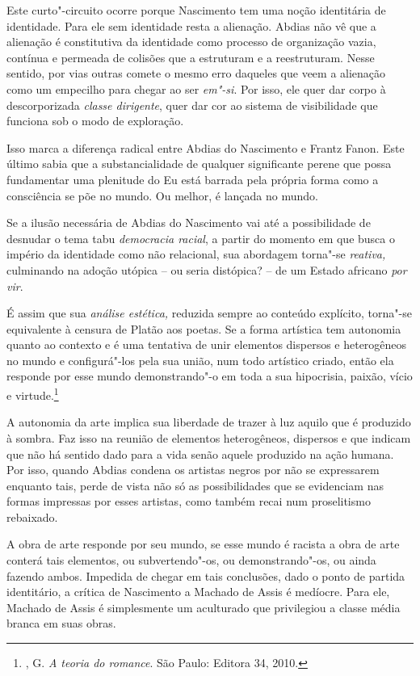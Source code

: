 Este curto"-circuito ocorre porque Nascimento tem uma noção identitária
de identidade. Para ele sem identidade resta a alienação. Abdias não vê
que a alienação é constitutiva da identidade como processo de
organização vazia, contínua e permeada de colisões que a estruturam e a
reestruturam. Nesse sentido, por vias outras comete o mesmo erro
daqueles que veem a alienação como um empecilho para chegar ao ser
\emph{em"-si}. Por isso, ele quer dar corpo à descorporizada \emph{classe
dirigente}, quer dar cor ao sistema de visibilidade que funciona sob o
modo de exploração.

Isso marca a diferença radical entre Abdias do Nascimento e Frantz
Fanon. Este último sabia que a substancialidade de qualquer significante
perene que possa fundamentar uma plenitude do Eu está barrada pela
própria forma como a consciência se põe no mundo. Ou melhor, é lançada
no mundo.

Se a ilusão necessária de Abdias do Nascimento vai até a possibilidade
de desnudar o tema tabu \emph{democracia racial}, a partir do momento em
que busca o império da identidade como não relacional, sua abordagem
torna"-se \emph{reativa,} culminando na adoção utópica -- ou seria
distópica? -- de um Estado africano \emph{por vir}.

É assim que sua \emph{análise estética,} reduzida sempre ao conteúdo
explícito, torna"-se equivalente à censura de Platão aos poetas. Se a
forma artística tem autonomia quanto ao contexto e é uma tentativa de
unir elementos dispersos e heterogêneos no mundo e configurá"-los pela
sua união, num todo artístico criado, então ela responde por esse mundo
demonstrando"-o em toda a sua hipocrisia, paixão, vício e
virtude.\footnote{, G. \emph{A teoria do romance}. São Paulo:
  Editora 34, 2010.}

A autonomia da arte implica sua liberdade de trazer à luz aquilo que é
produzido à sombra. Faz isso na reunião de elementos heterogêneos,
dispersos e que indicam que não há sentido dado para a vida senão aquele
produzido na ação humana. Por isso, quando Abdias condena os artistas
negros por não se expressarem enquanto tais, perde de vista não só as
possibilidades que se evidenciam nas formas impressas por esses
artistas, como também recai num proselitismo rebaixado.

A obra de arte responde por seu mundo, se esse mundo é racista a obra de
arte conterá tais elementos, ou subvertendo"-os, ou demonstrando"-os, ou
ainda fazendo ambos. Impedida de chegar em tais conclusões, dado o ponto
de partida identitário, a crítica de Nascimento a Machado de Assis é
medíocre. Para ele, Machado de Assis é simplesmente um aculturado que
privilegiou a classe média branca em suas obras.

